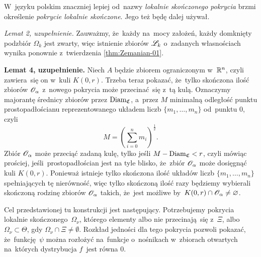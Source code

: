 \documentclass[a4paper,11pt]{article}
\numberwithin{equation}{section}
\begin{document}
\noindent
{} W~języku polskim znaczniej lepiej od~nazwy
\textit{lokalnie skończonego pokrycia} brzmi określenie \textit{pokrycie
  lokalnie skończone}. Jego też będę dalej używał.

\VerSpaceFour





\noindent
{} \textit{Lemat 2, uzupełnienie.} Zauważmy, że~każdy na~mocy
założeń, każdy domknięty podzbiór $\Omega_{ k }$ jest zwarty, więc
istnienie zbiorów $\mathcal{L}_{ k }$ o~zadanych własnościach wynika ponownie
z~twierdzenia \eqref{thm:Zemanian-01}.

\VerSpaceFour





\noindent
{} \textbf{Lemat 4, uzupełnienie.} Niech $A$ będzie zbiorem
ograniczonym w~$\mathbb{R}^{ n }$, czyli zawiera~się on w~kuli $K( 0, r )$. Trzeba
teraz pokazać, że~tylko skończona ilość zbiorów $\mathcal{O}_{ \alpha }$ z~nowego
pokrycia może przecinać~się z~tą kulą. Oznaczymy majorantę średnicy
zbiorów przez $\operatorname{Diam}_{ \mathfrak{C} }$, a~przez $M$ minimalną
odległość punktu prostopadłościanu reprezentowanego układem liczb
$\{ m_{ 1 }, \ldots, m_{ n } \}$ od~punktu $0$, czyli
\begin{equation}
  \label{eq:Zemanian-06}
  M = \left( \sum_{ i = 0 }^{ n } m_{ i } \right)^{ \frac{ 1 }{ 2 } }.
\end{equation}
Zbiór $\mathcal{O}_{ \alpha }$ może przeciąć zadaną kulę, tylko jeśli
$M - \operatorname{Diam}_{ \mathfrak{C} } < r$, czyli mówiąc prościej,
jeśli~prostopadłościan jest na tyle blisko, że~zbiór $\mathcal{O}_{ \alpha }$
może dosięgnąć kuli $K( 0, r )$. Ponieważ istnieje tylko skończona
ilość układów liczb $\{ m_{ 1 }, \ldots, m_{ n } \}$ spełniających tę
nierówność, więc tylko skończoną ilość razy będziemy wybierali
skończoną rodzinę zbiorów $\mathcal{O}_{ \alpha }$ takich, że~jest możliwe
by~$K( 0, r ) \cap \mathcal{O}_{ \alpha } \neq \varnothing$.

\VerSpaceFour





\noindent
{} Cel przedstawionej tu konstrukcji jest następujący.
Potrzebujemy pokrycia lokalnie skończonego~$\Omega_{ \nu }$, którego
elementy albo nie przecinają~się z~$\Xi$, albo
$\Omega_{ \nu } \subset \Theta$, gdy $\Omega_{ \nu } \cap \Xi \neq \emptyset$.
Rozkład jedności dla tego pokrycia pozwoli pokazać, że~funkcję~$\psi$
można rozłożyć na~funkcje o~nośnikach w~zbiorach otwartych na~których
dystrybucja $f$~jest równa $0$.
\end{document}
